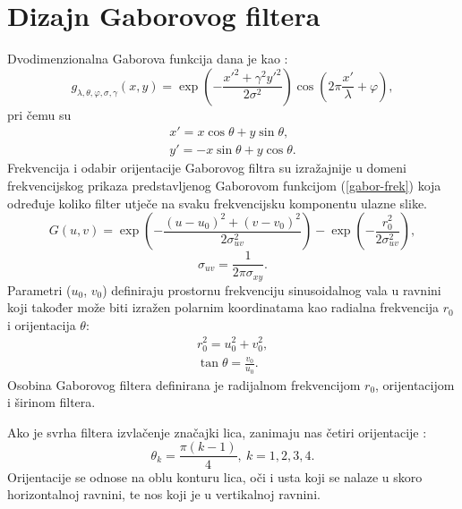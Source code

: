 \documentclass{article}
\begin{document}
\section{Dizajn Gaborovog filtera}
Dvodimenzionalna Gaborova funkcija dana je kao \citep{petkovgabor}:
\begin{equation}
g_{\lambda,\theta,\varphi,\sigma,\gamma}(x,y) = \exp\left ( -
\frac{x'^2+\gamma^2 y'^2}{2\sigma^2}\right ) \cos \left ( 2\pi \frac{x'}{\lambda} + \varphi \right ),
\label{2d-gabor}
\end{equation}
pri čemu su
\begin{eqnarray*}
x' = x \cos \theta + y \sin \theta, \\
y' = -x \sin \theta + y \cos \theta.
\end{eqnarray*}
Frekvencija i odabir orijentacije Gaborovog filtra su izražajnije u domeni
frekvencijskog prikaza predstavljenog Gaborovom funkcijom (\ref{gabor-frek}) koja
određuje koliko filter utječe na svaku frekvencijsku komponentu ulazne slike.
\begin{equation}
G(u,v) = \exp \left ( - \frac{(u-u_0)^2 + (v-v_0)^2}{2\sigma^2_{uv}}\right ) -
\exp \left ( - \frac{r_0^2}{2\sigma^2_{uv}} \right),
\label{gabor-frek}
\end{equation}
\begin{equation}
\sigma_{uv} = \frac{1}{2\pi \sigma_{xy}}.
\end{equation}
Parametri ($u_0$, $v_0$) definiraju prostornu frekvenciju sinusoidalnog vala u
ravnini koji također može biti izražen polarnim koordinatama kao radialna frekvencija $r_0$ i
orijentacija $\theta$:
\begin{eqnarray}
r_0^2 = u_0^2 + v_0^2, \\
\tan \theta = \frac{v_0}{u_0}.
\end{eqnarray}
Osobina Gaborovog filtera definirana je radijalnom frekvencijom $r_0$,
orijentacijom i širinom filtera.

Ako je svrha filtera izvlačenje značajki lica, zanimaju nas četiri orijentacije
\citep{huang2005robust}:
\begin{equation}
\theta_k = \frac{\pi(k-1)}{4},\: k = 1,2,3,4.
\label{equ:orijentacije}
\end{equation}
Orijentacije se odnose na oblu konturu lica, oči i usta koji se nalaze u skoro
horizontalnoj ravnini, te nos koji je u vertikalnoj ravnini.
\end{document}
